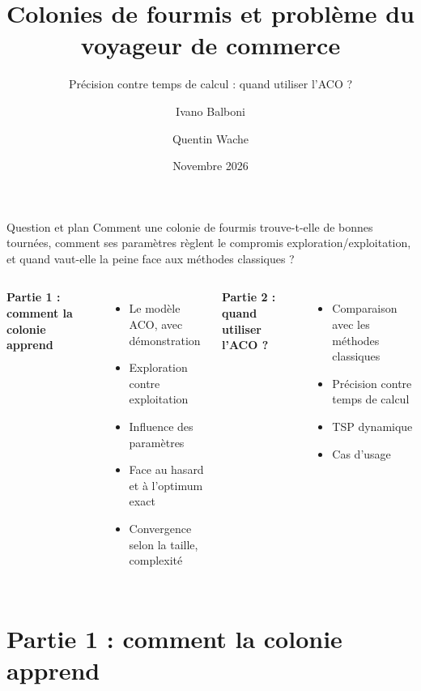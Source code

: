 \documentclass[aspectratio=169,11pt]{beamer}
\title{Colonies de fourmis et problème du voyageur de commerce}
\subtitle{Précision contre temps de calcul : quand utiliser l'ACO ?}
\author{Ivano Balboni \and Quentin Wache}
\date{Novembre 2026}
\begin{document}
\maketitle

\begin{frame}{Question et plan}
  \alert{Comment une colonie de fourmis trouve-t-elle de bonnes tournées,
  comment ses paramètres règlent le compromis exploration/exploitation, et quand vaut-elle la
  peine face aux méthodes classiques ?}

  \bigskip
  \begin{columns}[T]
    \textbf{Partie 1 : comment la colonie apprend}
    \begin{itemize}\small
      \item Le modèle ACO, avec démonstration
      \item Exploration contre exploitation
      \item Influence des paramètres
      \item Face au hasard et à l'optimum exact
      \item Convergence selon la taille, complexité
    \end{itemize}
    \textbf{Partie 2 : quand utiliser l'ACO ?}
    \begin{itemize}\small
      \item Comparaison avec les méthodes classiques
      \item Précision contre temps de calcul
      \item TSP dynamique
      \item Cas d'usage
    \end{itemize}
  \end{columns}
\end{frame}


\section{Partie 1 : comment la colonie apprend}
\end{document}
